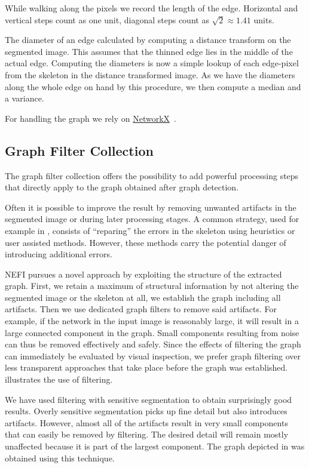 		While walking along the pixels we record the length of the edge. Horizontal and vertical steps count as one unit, diagonal steps count as $\sqrt 2\approx 1.41$ units.

		The diameter of an edge calculated by computing a distance transform on the segmented image. This assumes that the thinned edge lies in the middle of the actual edge. Computing the diameters is now a simple lookup of each edge-pixel from the skeleton in the distance transformed image. As we have the diameters along the whole edge on hand by this procedure, we then compute a median and a variance.

		For handling the graph we rely on \href{https://networkx.github.io/documentation/latest/index.html}{NetworkX}~\cite{networkx}.

	\subsection{Graph Filter Collection}

		The graph filter collection offers the possibility to add powerful processing steps that directly apply to the graph obtained after graph detection. 

		Often it is possible to improve the result by removing unwanted artifacts in the segmented image or during later processing stages.	A common strategy, used for example in \cite{baumgarten2010detection, baumgarten2012computational}, consists of ``reparing'' the errors in the skeleton using heuristics or user assisted methods. However, these methods carry the potential danger of introducing additional errors. 

		NEFI pursues a novel approach by exploiting the structure of the extracted graph. First, we retain a maximum of structural information by not altering the segmented image or the skeleton at all, \ie we establish the graph including all artifacts. Then we use dedicated graph filters to remove said artifacts. For example, if the network in the input image is reasonably large, it will result in a large connected component in the graph. Small components resulting from noise can thus be removed effectively and safely. Since the effects of filtering the graph can immediately be evaluated by visual inspection, we prefer graph filtering over less transparent approaches that take place before the graph was established.  illustrates the use of filtering.

		We have used filtering with sensitive segmentation to obtain surprisingly good results. Overly sensitive segmentation picks up fine detail but also introduces artifacts. However, almost all of the artifacts result in very small components that can easily be removed by filtering. The desired detail will remain mostly unaffected because it is part of the largest component. The graph depicted in  was obtained using this technique.

